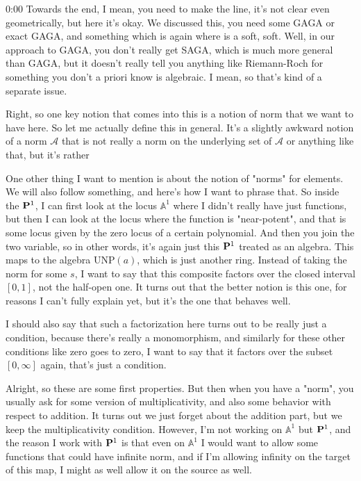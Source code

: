 \begin{unfinished}{0:00}
Towards the end, I mean, you need to make the line, it's not clear even geometrically, but here it's okay. We discussed this, you need some GAGA or exact GAGA, and something which is again where is a soft, soft. Well, in our approach to GAGA, you don't really get SAGA, which is much more general than GAGA, but it doesn't really tell you anything like Riemann-Roch for something you don't a priori know is algebraic. I mean, so that's kind of a separate issue.

Right, so one key notion that comes into this is a notion of norm that we want to have here. So let me actually define this in general. It's a slightly awkward notion of a norm $\mathcal{A}$ that is not really a norm on the underlying set of $\mathcal{A}$ or anything like that, but it's rather


One other thing I want to mention is about the notion of "norms" for elements. We will also follow something, and here's how I want to phrase that. So inside the $\P^1$, I can first look at the locus $\mathbb{A}^1$ where I didn't really have just functions, but then I can look at the locus where the function is "near-potent", and that is some locus given by the zero locus of a certain polynomial. And then you join the two variable, so in other words, it's again just this $\P^1$ treated as an algebra. This maps to the algebra $\mathrm{UNP}(a)$, which is just another ring. Instead of taking the norm for some $s$, I want to say that this composite factors over the closed interval $[0, 1]$, not the half-open one. It turns out that the better notion is this one, for reasons I can't fully explain yet, but it's the one that behaves well.

I should also say that such a factorization here turns out to be really just a condition, because there's really a monomorphism, and similarly for these other conditions like zero goes to zero, I want to say that it factors over the subset $[0, \infty]$ again, that's just a condition.

Alright, so these are some first properties. But then when you have a "norm", you usually ask for some version of multiplicativity, and also some behavior with respect to addition. It turns out we just forget about the addition part, but we keep the multiplicativity condition. However, I'm not working on $\mathbb{A}^1$ but $\P^1$, and the reason I work with $\P^1$ is that even on $\mathbb{A}^1$ I would want to allow some functions that could have infinite norm, and if I'm allowing infinity on the target of this map, I might as well allow it on the source as well.


\end{unfinished}
